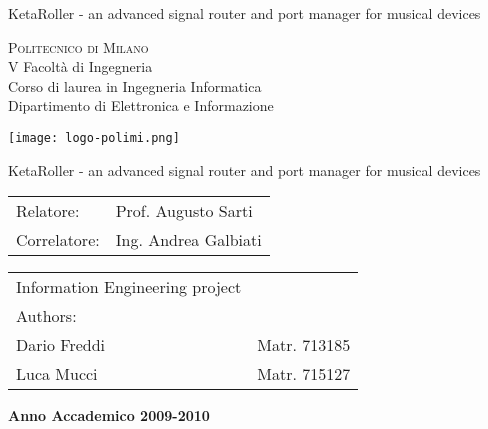 KetaRoller - an advanced signal router and port manager for musical devices

\begin{center}
\Large{\textsc{Politecnico di Milano}}\\
\large{V Facolt\`a di Ingegneria}\\
\large{Corso di laurea in Ingegneria Informatica}\\
\large{Dipartimento di Elettronica e Informazione}\\
\vspace{7mm}
\begin{DoxyImage}
\texttt{[image: logo-polimi.png]}
\end{DoxyImage}
\vspace{2mm}

\begin{LARGE}
KetaRoller - an advanced signal router and port manager for musical devices
\end{LARGE}
\vspace{25mm}

\begin{flushleft}
\begin{tabular}{l l }
Relatore:    & Prof. Augusto Sarti\\
Correlatore: & Ing. Andrea Galbiati\\
\end{tabular}
\end{flushleft}
\vspace{25mm}

\begin{flushright}
\begin{tabular}{l l }
Information Engineering project \\
Authors: & \\
Dario Freddi & Matr. 713185 \\
Luca Mucci & Matr. 715127
\end{tabular}
\end{flushright}
\vspace{43mm}
{\large{\bf Anno Accademico 2009-2010}}
\end{center}
